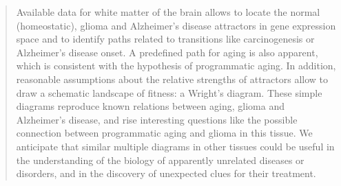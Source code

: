 \begin{quote}

{\large Available data for white matter of the brain allows to locate the normal (homeostatic), glioma and Alzheimer’s disease attractors in gene expression space and to identify paths related to transitions like carcinogenesis or Alzheimer’s disease onset. A predefined path for aging is also apparent, which is consistent with the hypothesis of programmatic aging. In addition, reasonable assumptions about the relative strengths of attractors allow to draw a schematic landscape of fitness: a Wright’s diagram. These simple diagrams reproduce known relations between aging, glioma and Alzheimer’s disease, and rise interesting questions like the possible connection between programmatic aging and glioma in this tissue. We anticipate that similar multiple diagrams in other tissues could be useful in the understanding of the biology of apparently unrelated diseases or disorders, and in the discovery of unexpected clues for their treatment.
}


\end{quote}


\vfill
\cleardoublepage
